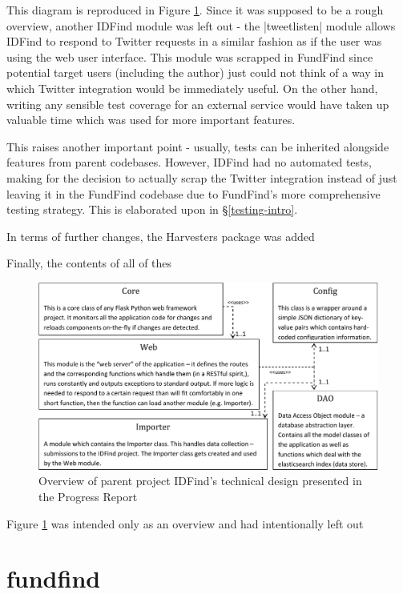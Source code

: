 This diagram is reproduced in Figure \ref{fig:idfind-uml}. Since it was supposed to be a rough overview, another IDFind module was left out - the |tweetlisten| module allows IDFind to respond to Twitter requests in a similar fashion as if the user was using the web user interface. This module was scrapped in FundFind since potential target users (including the author) just could not think of a way in which Twitter integration would be immediately useful. On the other hand, writing any sensible test coverage for an external service would have taken up valuable time which was used for more important features.

This raises another important point - usually, tests can be inherited alongside features from parent codebases. However, IDFind had no automated tests, making for the decision to actually scrap the Twitter integration instead of just leaving it in the FundFind codebase due to FundFind's more comprehensive testing strategy. This is elaborated upon in \S\ref{testing-intro}.

In terms of further changes, the Harvesters package was added

Finally, the contents of all of thes

\begin{figure}[H]
\centering
\includegraphics[width=1.00\textwidth,]{Chapter3/idfind-uml.pdf}
\caption{Overview of parent project IDFind's technical design presented in the Progress Report \cite{progress-report}}
\label{fig:idfind-uml}
\end{figure}

Figure \ref{fig:idfind-uml} was intended only as an overview and had intentionally left out

\section{fundfind}
\label{design-main-first}

